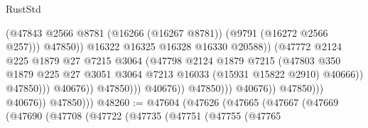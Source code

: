 \begin{lexlean}{RustStd}
\begin{coremodule}
                                                        (@47843
                                                          @2566
                                                          @8781
                                                          (@16266 (@16267 @8781))
                                                          (@9791 (@16272 @2566 @257)))
                                                        @47850))
                                                    @16322
                                                    @16325
                                                    @16328
                                                    @16330
                                                    @20588))
                                                (@47772
                                                  @2124
                                                  @225
                                                  @1879
                                                  @27
                                                  @7215
                                                  @3064
                                                  (@47798
                                                    @2124
                                                    @1879
                                                    @7215
                                                    (@47803
                                                      @350
                                                      @1879
                                                      @225
                                                      @27
                                                      @3051
                                                      @3064
                                                      @7213
                                                      @16033
                                                      (@15931 @15822 @2910)
                                                      @40666))
                                                  @47850)))
                                            @40676))
                                        @47850)))
                                  @40676))
                              @47850)))
                        @40676))
                    @47850)))
              @40676))
          @47850)))
@48260 := @47604
    (@47626
      (@47665
        (@47667
          (@47669
            (@47690
              (@47708
                (@47722
                  (@47735
                    (@47751
                      (@47755
                        (@47765

\end{coremodule}
\end{lexlean}
